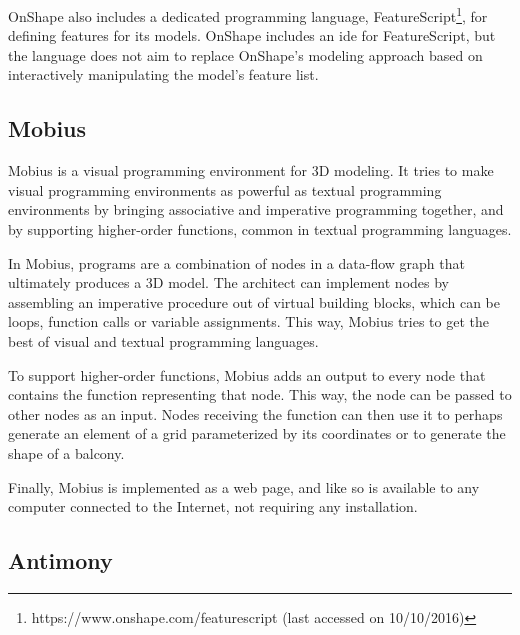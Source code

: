 OnShape also includes a dedicated programming language, FeatureScript\footnote{https://www.onshape.com/featurescript (last accessed on 10/10/2016)}, for defining features for its models.
OnShape includes an \gls{ide} for FeatureScript, but the language does not aim to replace OnShape's modeling approach based on interactively manipulating the model's feature list.


\subsection{Mobius}

Mobius is a visual programming environment for 3D modeling.
It tries to make visual programming environments as powerful as textual programming environments by bringing associative and imperative programming together, and by supporting higher-order functions, common in textual programming languages\cite{Janssen2016}.

In Mobius, programs are a combination of nodes in a data-flow graph that ultimately produces a 3D model.
The architect can implement nodes by assembling an imperative procedure out of virtual building blocks, which can be loops, function calls or variable assignments.
This way, Mobius tries to get the best of visual and textual programming languages.

To support higher-order functions, Mobius adds an output to every node that contains the function representing that node.
This way, the node can be passed to other nodes as an input.
Nodes receiving the function can then use it to perhaps generate an element of a grid parameterized by its coordinates or to generate the shape of a balcony.

Finally, Mobius is implemented as a web page, and like so is available to any computer connected to the Internet, not requiring any installation.




\subsection{Antimony}

